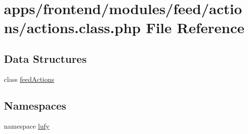 \hypertarget{frontend_2modules_2feed_2actions_2actions_8class_8php}{\section{apps/frontend/modules/feed/actions/actions.class.\-php File Reference}
\label{frontend_2modules_2feed_2actions_2actions_8class_8php}
}
\subsection*{Data Structures}
\begin{DoxyCompactItemize}
\item 
class \hyperlink{classfeed_actions}{feed\-Actions}
\end{DoxyCompactItemize}
\subsection*{Namespaces}
\begin{DoxyCompactItemize}
\item 
namespace \hyperlink{namespacelufy}{lufy}
\end{DoxyCompactItemize}
